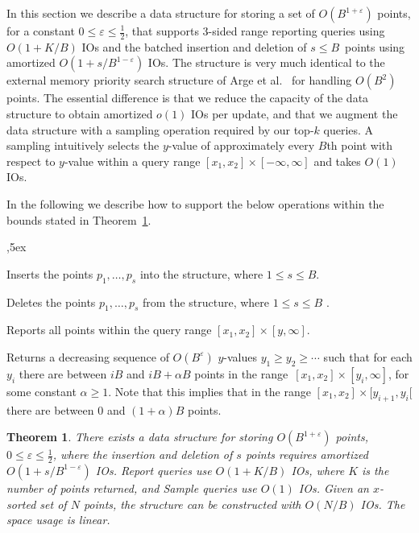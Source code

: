 \documentclass[11pt]{article}
\newtheorem{theorem}{Theorem}
\begin{document}
In this section we describe a data structure for storing a set of
$O(B^{1+\varepsilon})$ points, for a constant $0\leq\varepsilon\leq
\frac{1}{2}$, that supports 3-sided range reporting queries using
$O(1+K/B)$ IOs and the batched insertion and deletion of $s\leq
B$~points using amortized $O(1+s/B^{1-\varepsilon})$ IOs. The
structure is very much identical to the external memory priority
search structure of Arge et al.~\cite[Section~3.1]{pods99asv} for
handling $O(B^2)$ points.  The essential difference is that we reduce
the capacity of the data structure to obtain amortized $o(1)$ IOs per
update, and that we augment the data structure with a sampling
operation required by our top-$k$ queries. A sampling intuitively
selects the $y$-value of approximately every $B$th point with respect
to $y$-value within a query range $[x_1,x_2]\times[-\infty,\infty]$
and takes $O(1)$ IOs.

In the following we describe how to support the below operations
within the bounds stated in Theorem~\ref{thm:child-structure}.
\begin{description}
\itemsep0pt
,5ex
\item[$\mathrm{Insert}(p_1,\ldots,p_s)$] Inserts the points
  $p_1,\ldots,p_s$ into the structure, where $1\leq s\leq B$.
\item[$\mathrm{Deletes}(p_1,\ldots,p_s)$] Deletes the points
  $p_1,\ldots,p_s$ from the structure, where $1\leq s\leq B$ .
\item[$\mathrm{Report}(x_1,x_2,y)$] Reports all points within the
  query range $[x_1,x_2]\times[y,\infty]$.
\item[$\mathrm{Sample}(x_1,x_2)$] Returns a decreasing sequence of
  $O(B^{\varepsilon})$ $y$-values $y_1\geq y_2\geq \cdots$ such that
  for each $y_i$ there are between $iB$ and $iB+\alpha B$ points in
  the range~$[x_1,x_2]\times[y_i,\infty]$, for some constant
  $\alpha\geq 1$. Note that this implies that in the range
  $[x_1,x_2]\times[y_{i+1},y_i[$ there are between 0 and $(1+\alpha)B$
      points.
\end{description}

\begin{theorem}
\label{thm:child-structure}
  There exists a data structure for storing $O(B^{1+\varepsilon})$
  points, $0\leq \varepsilon\leq \frac{1}{2}$, where the insertion and
  deletion of $s$ points requires amortized $O(1+s/B^{1-\varepsilon})$
  IOs.  Report queries use $O(1+K/B)$ IOs, where $K$ is the number of
  points returned, and Sample queries use $O(1)$ IOs. Given an
  $x$-sorted set of $N$ points, the structure can be constructed with
  $O(N/B)$ IOs.  The space usage is linear.
\end{theorem}
\end{document}

